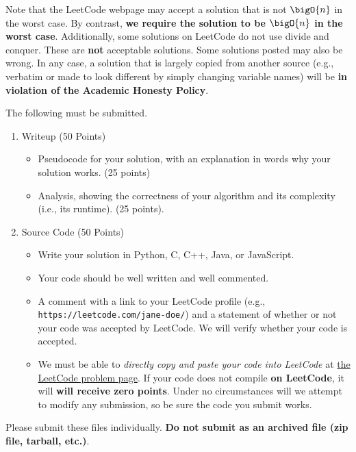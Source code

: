 \documentclass[final]{article}
\begin{document}
\begin{titlepage}
    Note that the LeetCode webpage may accept a solution that is not $\bigO{n}$ in the worst case. By contrast, \textbf{we require the solution to be $\bigO{n}$ in the worst case}. Additionally, some solutions on LeetCode do not use divide and conquer. These are \textbf{not} acceptable solutions. Some solutions posted may also be wrong. In any case,
    a solution that is largely copied from another source (e.g., verbatim or made to look different by simply changing variable names) will be \textbf{in violation of the Academic Honesty Policy}.

    The following must be submitted.
    \begin{enumerate}[label=\textbf{(\alph*)}]
        \item Writeup (50 Points)
              \begin{itemize}
                  \item Pseudocode for your solution, with an explanation in words why your solution works. (25 points)
                  \item Analysis, showing the correctness of your algorithm and its  complexity (i.e., its runtime). (25 points).
              \end{itemize}
        \item Source Code (50 Points)
              \begin{itemize}
                  \item Write your solution in Python, C, C++, Java, or JavaScript.
                  \item Your code should be well written and well commented.
                  \item A comment with a link to your LeetCode profile (e.g., \texttt{https://leetcode.com/jane-doe/}) and a statement of whether or not your code was accepted by LeetCode. We will verify whether your code is accepted.
                  \item We must be able to \emph{directly copy and paste your code into LeetCode} at \href{https://leetcode.com/problems/k-closest-points-to-origin/}{the LeetCode problem page}. If your code does not compile \textbf{on LeetCode}, it will \textbf{will receive zero points}. Under no circumstances will we attempt to modify any submission, so be sure the code you submit works.
              \end{itemize}
    \end{enumerate}
    Please submit these files individually. \textbf{Do not submit as an archived file (zip file, tarball, etc.)}.
\end{titlepage}
\end{document}
